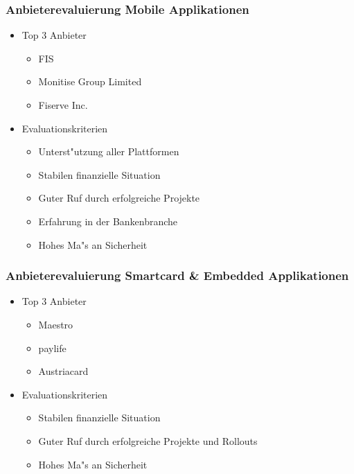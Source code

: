\documentclass{beamer}
\begin{document}
\begin{frame}[plain]
  \frametitle{Anbieterevaluierung Mobile Applikationen}
  \begin{itemize}

	\item Top 3 Anbieter
		\begin{itemize}
			\item FIS
			\item Monitise Group Limited
			\item Fiserve Inc.\vspace{2mm}
		\end{itemize}

	\item Evaluationskriterien
		\begin{itemize}
			\item Unterst"utzung aller Plattformen
			\item Stabilen finanzielle Situation
			\item Guter Ruf durch erfolgreiche Projekte
			\item Erfahrung in der Bankenbranche
			\item Hohes Ma"s an Sicherheit
		\end{itemize}	
		
  \end{itemize}
\end{frame}

\begin{frame}[plain]
  \frametitle{Anbieterevaluierung Smartcard \& Embedded Applikationen}
  \begin{itemize}

	\item Top 3 Anbieter
		\begin{itemize}
			\item Maestro
			\item paylife
			\item Austriacard\vspace{2mm}
		\end{itemize}

	\item Evaluationskriterien
		\begin{itemize}
			\item Stabilen finanzielle Situation
			\item Guter Ruf durch erfolgreiche Projekte und Rollouts
			\item Hohes Ma"s an Sicherheit
		\end{itemize}	
		
  \end{itemize}
\end{frame}
\end{document}
